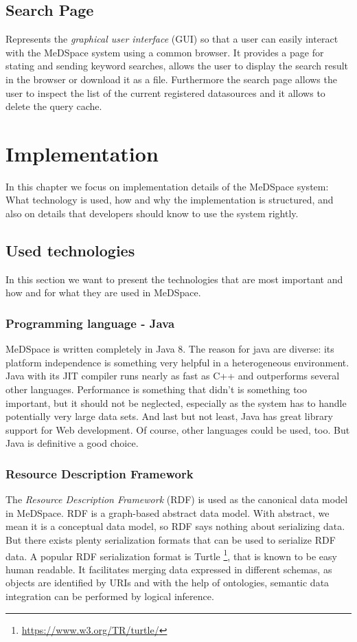 \section{Search Page}
Represents the \emph{graphical user interface} (GUI) so that a user can easily interact with the MeDSpace system using a common browser. It provides a page for stating and sending keyword searches, allows the user to display the search result in the browser or download it as a file. Furthermore the search page allows the user to inspect the list of the current registered datasources and it allows to delete the query cache.

\chapter{Implementation}
In this chapter we focus on implementation details of the MeDSpace system: What technology is used, how and why the implementation is structured, and also on details that developers should know to use the system rightly.

\section{Used technologies}

In this section we want to present the technologies that are most important and how and for what they are used in MeDSpace.

\subsection{Programming language - Java}
MeDSpace is written completely in Java 8. The reason for java are diverse: its platform independence is something very helpful in a heterogeneous environment. Java with its JIT compiler runs nearly as fast as C++ and outperforms several other languages. Performance is something that didn't is something too important, but it should not be neglected, especially as the system has to handle potentially very large data sets. And last but not least, Java has great library support for Web development. 
Of course, other languages could be used, too. But Java is definitive a good choice.


\subsection{Resource Description Framework}

The \emph{Resource Description Framework} (RDF) \cite{w3RDF} is used as the canonical data model in MeDSpace. RDF is a graph-based abstract data model. With abstract, we mean it is a conceptual data model, so RDF says nothing about serializing data. But there exists plenty serialization formats that can be used to serialize RDF data. A popular RDF serialization format is Turtle \footnote{\url{https://www.w3.org/TR/turtle/}}, that is known to be easy human readable.
It facilitates merging data expressed in different schemas, as objects are identified by URIs and with the help of ontologies, semantic data integration can be performed by logical inference. 

